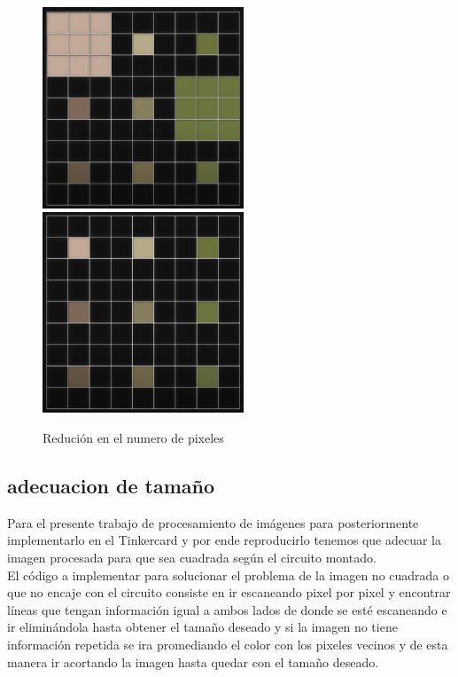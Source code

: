 \documentclass{article}
\begin{document}
\begin{figure}[h]
\includegraphics[width=6cm]{MatrizCompleta.png}
\includegraphics[width=6cm]{MatrizReducida.png}
\centering
\caption{Redución en el numero de pixeles}
\label{fig:matriz de leds}
\end{figure}

\subsection{adecuacion de tamaño }
Para el presente trabajo de procesamiento de imágenes para posteriormente implementarlo en el Tinkercard y por ende reproducirlo tenemos que adecuar la imagen procesada para que sea cuadrada según el circuito montado.\\
El código a implementar para solucionar el problema de la imagen no cuadrada o que no encaje con el circuito consiste en  ir escaneando pixel por pixel y encontrar  líneas que tengan información igual a ambos lados de donde se esté escaneando  e ir eliminándola hasta obtener el tamaño deseado y si la imagen no tiene información repetida se ira promediando el color con los pixeles vecinos y de esta manera ir acortando la imagen hasta quedar con el tamaño deseado.
\end{document}

